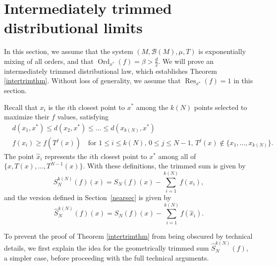 \documentclass[11pt,twoside,a4paper,reqno]{amsart}
\newcommand{\Ord}{\operatorname{Ord}}
\newcommand{\Res}{\operatorname{Res}}
\begin{document}
\section{Intermediately trimmed distributional limits}\label{intersec}
In this section, we assume that the system $(M, \mathcal{B}(M), \mu, T)$ is exponentially mixing of all orders, and that $\Ord_{x^*}(f) = \beta >\frac{d}{2}$. We will prove an intermediately trimmed distributional law, which establishes Theorem \ref{intertrimthm}. Without loss of generality, we assume that $\Res_{x^*}(f) = 1$ in this section.



Recall that $x_i$ is the $i$th closest point to $x^*$ among the $k(N)$ points selected to maximize their $f$ values, satisfying
\begin{align*}
&d(x_1,x^*) \leq d(x_2,x^*)\leq\ldots\leq d(x_{k(N)}, x^*)\\
& f(x_i) \geq f(T^j(x)) \quad \text{for } 1\leq i\leq k(N),\, 0\leq j\leq N-1,\, T^j(x)\not\in \{x_1,\ldots,x_{k(N)}\}.
\end{align*}
The point $\hat{x}_i$ represents the $i$th closest point to $x^*$ among all of $\{x, T(x), \ldots, T^{N-1}(x)\}$. With these definitions, the trimmed sum is given by
\begin{equation*}
S_N^{k(N)}(f)(x) = S_N(f)(x) - \sum_{i=1}^{k(N)} f(x_i),
\end{equation*}
and the version defined in Section~\ref{nearsec} is given by
\begin{equation*}
\hat{S}_N^{k(N)}(f)(x) = S_N(f)(x) - \sum_{i=1}^{k(N)} f(\hat{x}_i).
\end{equation*}


To prevent the proof of Theorem \ref{intertrimthm} from being obscured by technical details, we first explain the idea for the geometrically trimmed sum $\hat{S}_N^{k(N)}(f)$, a simpler case, before proceeding with the full technical arguments.
\end{document}
